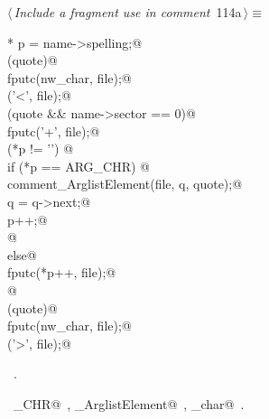 \documentclass[a4paper]{report}
\begin{document}
\begin{flushleft} \small
\begin{minipage}{\linewidth}\label{scrap242}\raggedright\small
{} $\langle\,${\it Include a fragment use in comment}\nobreak\ {\footnotesize {114a}}$\,\rangle\equiv$
\vspace{-1ex}
\begin{list}{}{} \item
\mbox{}\verb@char * p = name->spelling;@\\
\mbox{}\verb@if (quote)@\\
\mbox{}\verb@   fputc(nw_char, file);@\\
\mbox{}\verb@fputc('<', file);@\\
\mbox{}\verb@if (quote && name->sector == 0)@\\
\mbox{}\verb@   fputc('+', file);@\\
\mbox{}\verb@while (*p != '') {@\\
\mbox{}\verb@  if (*p == ARG_CHR) {@\\
\mbox{}\verb@    comment_ArglistElement(file, q, quote);@\\
\mbox{}\verb@    q = q->next;@\\
\mbox{}\verb@    p++;@\\
\mbox{}\verb@  }@\\
\mbox{}\verb@  else@\\
\mbox{}\verb@     fputc(*p++, file);@\\
\mbox{}\verb@}@\\
\mbox{}\verb@if (quote)@\\
\mbox{}\verb@   fputc(nw_char, file);@\\
\mbox{}\verb@fputc('>', file);@{\NWsep}
\end{list}
\vspace{-1.5ex}
\footnotesize
\begin{list}{}{\setlength{\itemsep}{-\parsep}\setlength{\itemindent}{-\leftmargin}}
\item \NWtxtMacroRefIn\ .
\item \NWtxtIdentsUsed\nobreak\  \verb@ARG_CHR@\nobreak\ , \verb@comment_ArglistElement@\nobreak\ , \verb@nw_char@\nobreak\ .
\item{}
\end{list}
\end{minipage}\vspace{4ex}
\end{flushleft}
\end{document}
